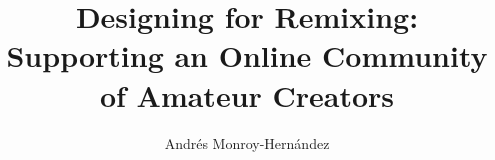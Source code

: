 %
%
%
%
%
%
\title{Designing for Remixing:\\Supporting an Online Community of Amateur Creators}
\author{
  \alignauthor Andrés Monroy-Hernández\\
}




